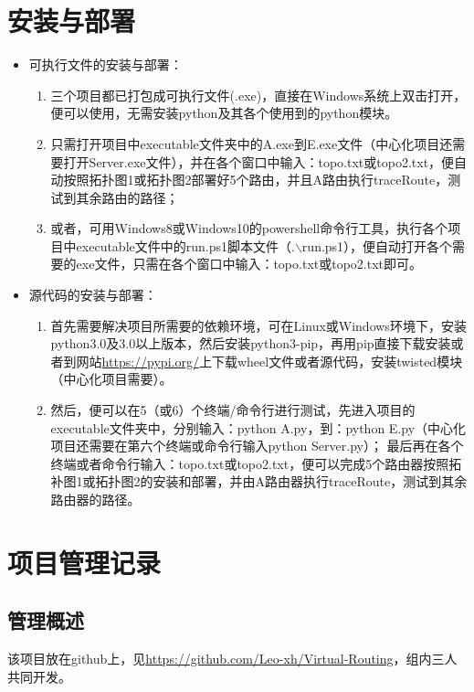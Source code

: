 \documentclass[15pt]{ctexart}
\begin{document}
\section{安装与部署} %
\label{sec:安装与部署}
	\begin{itemize}
		\item 可执行文件的安装与部署：
			\begin{enumerate}
				\item 三个项目都已打包成可执行文件(.exe)，直接在Windows系统上双击打开，便可以使用，无需安装python及其各个使用到的python模块。
				\item 只需打开项目中executable文件夹中的A.exe到E.exe文件（中心化项目还需要打开Server.exe文件），并在各个窗口中输入：topo.txt或topo2.txt，便自动按照拓扑图1或拓扑图2部署好5个路由，并且A路由执行traceRoute，测试到其余路由的路径；
				\item 或者，可用Windows8或Windows10的powershell命令行工具，执行各个项目中executable文件中的run.ps1脚本文件（.$\backslash$run.ps1），便自动打开各个需要的exe文件，只需在各个窗口中输入：topo.txt或topo2.txt即可。
			\end{enumerate}
		\item 源代码的安装与部署：
			\begin{enumerate}
				\item 首先需要解决项目所需要的依赖环境，可在Linux或Windows环境下，安装python3.0及3.0以上版本，然后安装python3-pip，再用pip直接下载安装或者到网站\url{https://pypi.org/}上下载wheel文件或者源代码，安装twisted模块（中心化项目需要）。
				\item 然后，便可以在5（或6）个终端/命令行进行测试，先进入项目的executable文件夹中，分别输入：python A.py，到：python E.py（中心化项目还需要在第六个终端或命令行输入python Server.py）；
				最后再在各个终端或者命令行输入：topo.txt或topo2.txt，便可以完成5个路由器按照拓补图1或拓扑图2的安装和部署，并由A路由器执行traceRoute，测试到其余路由器的路径。
			\end{enumerate}
	\end{itemize}

\section{项目管理记录} %
\label{sec:项目管理记录}
	\subsection{管理概述} %
	\label{sub:管理概述}
		该项目放在github上，见\url{https://github.com/Leo-xh/Virtual-Routing}，组内三人共同开发。
\end{document}
